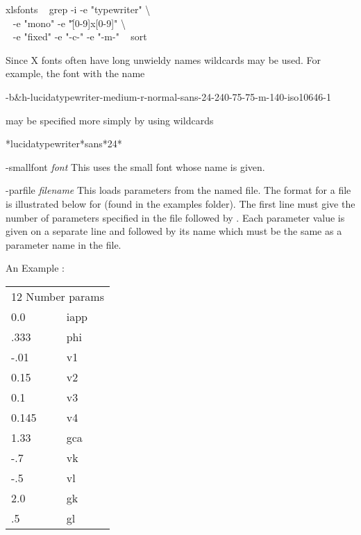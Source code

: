 \begin{description}
\begin{center}\ttfamily\begin{minipage}{55ex}
              xlsfonts \textbar~ grep -i -e "typewriter" \textbackslash \\
                     $~~$ -e "mono" -e "\^[0-9]x[0-9]" \textbackslash \\
                     $~~$ -e "fixed" -e "-c-" -e "-m-" \textbar~ sort
\end{minipage}\end{center}
Since X fonts often have long unwieldy names wildcards may be used.  For example, the font with the name
\begin{center}\ttfamily
	-b\&h-lucidatypewriter-medium-r-normal-sans-24-240-75-75-m-140-iso10646-1
\end{center}
may be specified more simply by using wildcards
\begin{center}\ttfamily
*lucidatypewriter*sans*24*
\end{center}
\item{-smallfont \emph{font}} This uses the small font whose name is given.
\item{-parfile \emph{filename}} This loads parameters from the named file. The format for a {} file is illustrated below for {} (found in the examples {} folder).  The first line must give the number of parameters specified in the file followed by {}.  Each parameter value is given on a separate line and followed by its name which must be the same as a parameter name in the {} file. 
\begin{center}
\begin{minipage}{55ex}
\begin{center}An Example {}:
\end{center}\ttfamily
\begin{tabular}{ll}
\multicolumn{2}{l}{12 Number params}\\
0.0 & iapp\\
.333 & phi\\
-.01 & v1\\
0.15 & v2\\
0.1 & v3\\
0.145 & v4\\
1.33 & gca\\
-.7 & vk\\
-.5 & vl\\
2.0 & gk\\
.5 & gl\\

\end{tabular}
\end{minipage}
\end{center}
\end{description}
